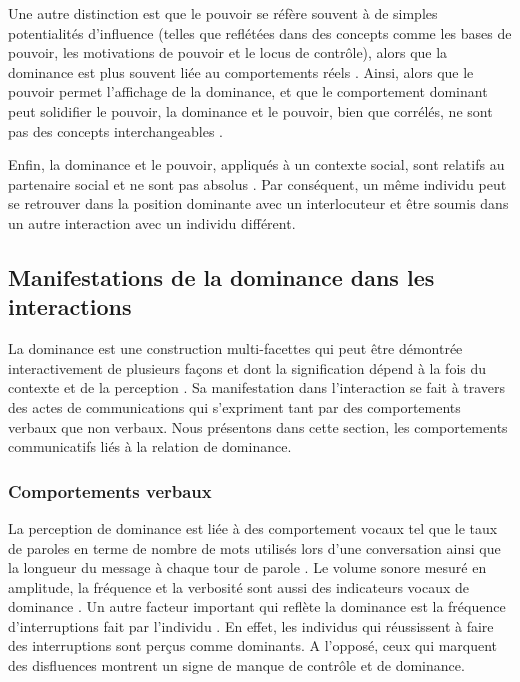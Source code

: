 		Une autre distinction est que le pouvoir se réfère souvent à de simples potentialités d'influence (telles que reflétées dans des concepts comme les bases de pouvoir, les motivations de pouvoir et le locus de contrôle),
		alors que la dominance est plus souvent liée au comportements réels \cite{dunbar2005perceptions,burgoon1998nature}. 
		Ainsi, alors que le pouvoir permet l'affichage de la dominance, et que le comportement dominant peut solidifier le pouvoir, la dominance et le pouvoir, bien que corrélés, ne sont pas des concepts interchangeables \cite{burgoon1995interpersonal}.
		
		Enfin, la dominance et le pouvoir, appliqués à un contexte social, sont relatifs au partenaire social et ne sont pas absolus \cite{dunbar2005perceptions}. Par conséquent, un même individu peut se retrouver dans la position dominante avec un interlocuteur et être soumis dans un autre interaction avec un individu différent.
		
		
	\subsection{Manifestations de la dominance dans les interactions}
	\label{sec:manifesationDom}
		La dominance est une construction multi-facettes qui peut être démontrée interactivement de plusieurs façons et dont la signification dépend à la fois du contexte et de la perception \cite{dunbar2005perceptions}. Sa manifestation dans l'interaction se fait à travers des actes de communications qui s'expriment tant par des comportements verbaux que non verbaux.
		Nous présentons dans cette section, les comportements communicatifs liés à la relation de dominance. 
		
		\subsubsection{Comportements verbaux}
			La perception de dominance est liée à des comportement vocaux tel que le taux de paroles en terme de nombre de mots utilisés lors d'une conversation ainsi que la longueur du message à chaque tour de parole \cite{dunbar2005perceptions}. Le volume sonore mesuré en amplitude, la fréquence et la verbosité sont aussi des indicateurs vocaux de dominance \cite{dunbar2005perceptions}. 
			Un autre facteur important qui reflète la dominance est la fréquence d'interruptions fait par l'individu \cite{dunbar2005perceptions,hall2005nonverbal}. En effet, les individus qui réussissent à faire des interruptions sont perçus comme dominants. A l'opposé, ceux qui marquent des disfluences montrent un signe de manque de contrôle et de dominance. 

